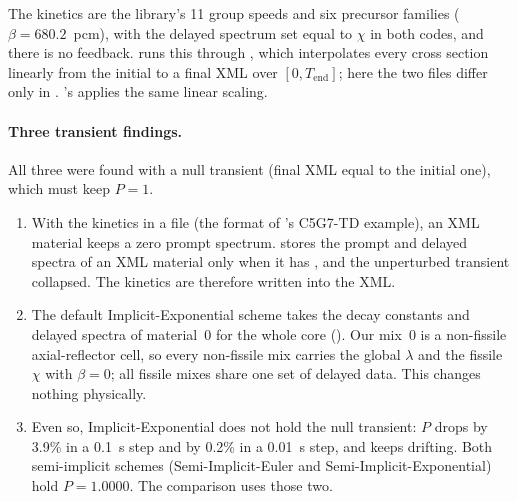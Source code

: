 The kinetics are the library's 11 group speeds and six precursor families
($\beta = 680.2$~pcm), with the delayed spectrum set equal to $\chi$ in both
codes, and there is no feedback. \ffn{} runs this through
, which interpolates every cross
section linearly from the initial to a final XML over $[0, T_\mathrm{end}]$;
here the two files differ only in . \garnet's 
applies the same linear scaling.

\paragraph{Three \ffn{} transient findings.} All three were found with a null
transient (final XML equal to the initial one), which must keep $P = 1$.
\begin{enumerate}
\item With the kinetics in a  file (the format of \ffn's
  C5G7-TD example), an XML material keeps a zero prompt spectrum. \ffn{}
  stores the prompt and delayed spectra of an XML material only when it has
  , and the unperturbed transient collapsed. The kinetics are
  therefore written into the XML.
\item The default Implicit-Exponential scheme takes the decay constants and
  delayed spectra of material~0 for the whole core
  (). Our mix~0 is a non-fissile
  axial-reflector cell, so every non-fissile mix carries the global $\lambda$
  and the fissile $\chi$ with $\beta = 0$; all fissile mixes share one set
  of delayed data. This changes nothing physically.
\item Even so, Implicit-Exponential does not hold the null transient: $P$
  drops by 3.9\% in a 0.1~s step and by 0.2\% in a 0.01~s step, and keeps
  drifting. Both semi-implicit schemes (Semi-Implicit-Euler and
  Semi-Implicit-Exponential) hold $P = 1.0000$. The comparison uses those two.
\end{enumerate}

